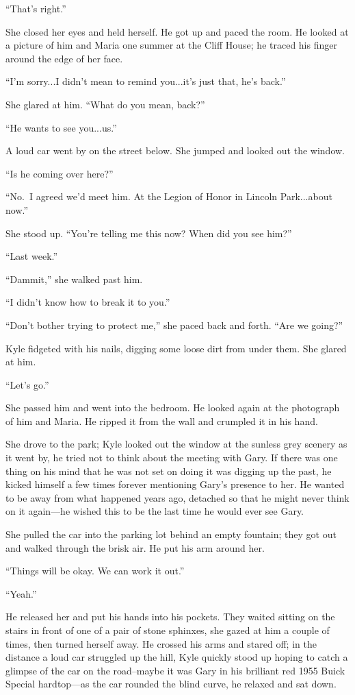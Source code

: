 ``That's right.''

She closed her eyes and held herself. He got up and paced the room. He
looked at a picture of him and Maria one summer at the Cliff House; he
traced his finger around the edge of her face.

``I'm sorry...I didn't mean to remind you...it's just that, he's back.''

She glared at him. ``What do you mean, back?''

``He wants to see you...us.''

A loud car went by on the street below. She jumped and looked out the
window.

``Is he coming over here?''

``No.~I agreed we'd meet him. At the Legion of Honor in Lincoln
Park...about now.''

She stood up. ``You're telling me this now? When did you see him?''

``Last week.''

``Dammit,'' she walked past him.

``I didn't know how to break it to you.''

``Don't bother trying to protect me,'' she paced back and forth. ``Are
we going?''

Kyle fidgeted with his nails, digging some loose dirt from under them.
She glared at him.

``Let's go.''

She passed him and went into the bedroom. He looked again at the
photograph of him and Maria. He ripped it from the wall and crumpled it
in his hand.

She drove to the park; Kyle looked out the window at the sunless grey
scenery as it went by, he tried not to think about the meeting with
Gary. If there was one thing on his mind that he was not set on doing it
was digging up the past, he kicked himself a few times forever
mentioning Gary's presence to her. He wanted to be away from what
happened years ago, detached so that he might never think on it
again---he wished this to be the last time he would ever see Gary.

She pulled the car into the parking lot behind an empty fountain; they
got out and walked through the brisk air. He put his arm around her.

``Things will be okay. We can work it out.''

``Yeah.''

He released her and put his hands into his pockets. They waited sitting
on the stairs in front of one of a pair of stone sphinxes, she gazed at
him a couple of times, then turned herself away. He crossed his arms and
stared off; in the distance a loud car struggled up the hill, Kyle
quickly stood up hoping to catch a glimpse of the car on the road--maybe
it was Gary in his brilliant red 1955 Buick Special hardtop---as the car
rounded the blind curve, he relaxed and sat down.

